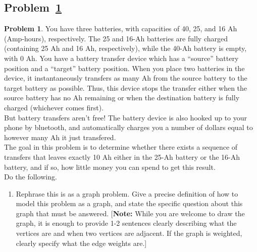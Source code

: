 \documentclass[11pt]{article}
\theoremstyle{definition}
\theoremstyle{definition}
\newtheorem{required}{Problem}
\theoremstyle{definition}
\begin{document}
\subsection{Problem~\ref{Dijkstra2}} 
\begin{required}\label{Dijkstra2}
You have three batteries, with capacities of 40, 25, and 16 Ah (Amp-hours), respectively. The 25 and 16-Ah batteries are fully charged (containing 25 Ah and 16 Ah, respectively), while the 40-Ah battery is empty, with 0 Ah. You have a battery transfer device which has a ``source'' battery position and a ``target'' battery position. When you place two batteries in the device, it instantaneously transfers as many Ah from the source battery to the target battery as possible. Thus, this device stops the transfer either when the source battery has no Ah remaining or when the destination battery is fully charged (whichever comes first).  \\

\noindent But battery transfers aren't free! The battery device is also hooked up to your phone by bluetooth, and automatically charges you a number of dollars equal to however many Ah it just transfered.  \\
	
\noindent The goal in this problem is to determine whether there exists a sequence of transfers that leaves exactly 10 Ah either in the 25-Ah battery or the 16-Ah battery, and if so, how little money you can spend to get this result. \\
\noindent Do the following.

\begin{enumerate}[label=(\alph*)]
\renewcommand{\thesubsubsection}{\thesubsection.\alph{subsubsection}}
	\subsubsection{Problem 2\ref{Dijkstra2a}}
	\item \label{Dijkstra2a} Rephrase this is as a graph problem. Give a precise definition of how to model this problem as a graph, and state the specific question about this graph that must be answered. [\textbf{Note:} While you are welcome to draw the graph, it is enough to provide 1-2 sentences clearly describing what the vertices are and when two vertices are adjacent. If the graph is weighted, clearly specify what the edge weights are.]
	

\end{enumerate}
\end{required}
\end{document}
